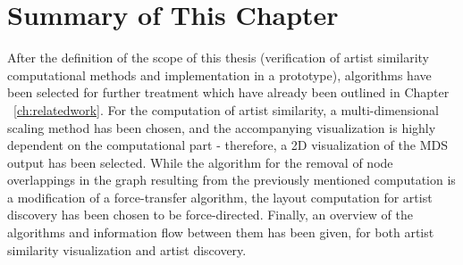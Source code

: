 \section{Summary of This Chapter}

After the definition of the scope of this thesis (verification of artist similarity computational methods and implementation in a prototype), algorithms have been selected for further treatment which have already been outlined in Chapter ~\ref{ch:relatedwork}. For the computation of artist similarity, a multi-dimensional scaling method has been chosen, and the accompanying visualization is highly dependent on the computational part - therefore, a 2D visualization of the MDS output has been selected. 
While the algorithm for the removal of node overlappings in the graph resulting from the previously mentioned computation is a modification of a force-transfer algorithm, the layout computation for artist discovery has been chosen to be force-directed. Finally, an overview of the algorithms and information flow between them has been given, for both artist similarity visualization and artist discovery.